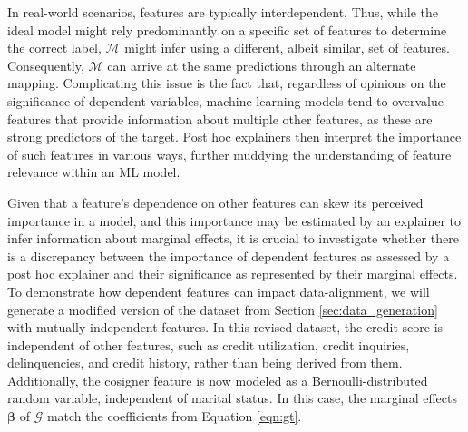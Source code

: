 \documentclass[mnsc,blindrev]{informs3}
\begin{document}
In real-world scenarios, features are typically interdependent. Thus, while the ideal model might rely predominantly on a specific set of features to determine the correct label, 
$\mathcal{M}$ might infer using a different, albeit similar, set of features. Consequently, 
$\mathcal{M}$ can arrive at the same predictions through an alternate mapping.
Complicating this issue is the fact that, regardless of opinions on the significance of dependent variables, machine learning models tend to overvalue features that provide information about multiple other features, as these are strong predictors of the target. Post hoc explainers then interpret the importance of such features in various ways, further muddying the understanding of feature relevance within an ML model.

Given that a feature's dependence on other features can skew its perceived importance in a model, and this importance may be estimated by an explainer to infer information about marginal effects, it is crucial to investigate whether there is a discrepancy between the importance of dependent features as assessed by a post hoc explainer and their significance as represented by their marginal effects. To demonstrate how dependent features can impact data-alignment, we will generate a modified version of the dataset from Section \ref{sec:data_generation} with mutually independent features. In this revised dataset, the credit score is independent of other features, such as credit utilization, credit inquiries, delinquencies, and credit history, rather than being derived from them. Additionally, the cosigner feature is now modeled as a Bernoulli-distributed random variable, independent of marital status. In this case, the marginal effects $\boldsymbol{\beta}$ of $\mathcal{G}$ match the coefficients from Equation \ref{eqn:gt}. %
\end{document}
